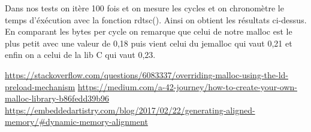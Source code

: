 \documentclass[12pt]{article}
\begin{document}
Dans nos tests on itère 100 fois et on mesure les cycles et on chronomètre le temps d'éxécution avec la fonction rdtsc(). Ainsi on obtient les résultats ci-dessus. En comparant les bytes per cycle on remarque que celui de notre malloc est le plus petit avec une valeur de 0,18 puis vient celui du jemalloc qui vaut 0,21 et enfin on a celui de la lib C qui vaut 0,23.

\begin{thebibliography}{9}
 \url{https://stackoverflow.com/questions/6083337/overriding-malloc-using-the-ld-preload-mechanism}
 \url{https://medium.com/a-42-journey/how-to-create-your-own-malloc-library-b86fedd39b96}
 \url{https://embeddedartistry.com/blog/2017/02/22/generating-aligned-memory/#dynamic-memory-alignment}
\end{thebibliography}
\end{document}
